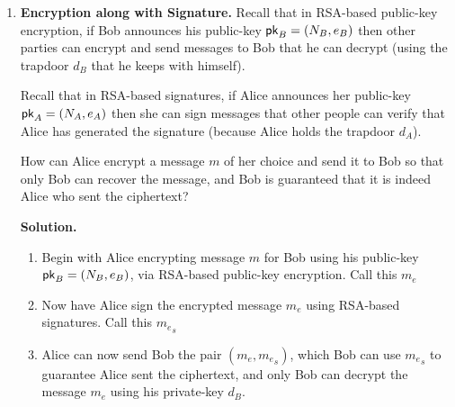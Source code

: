 \documentclass[11pt]{article}
\newcommand{\nextoddpage}{\checkoddpage\ifoddpage{\ \newpage\ \newpage}\else{\ \newpage}\fi}
\begin{document}
\begin{enumerate}
  {\bfseries Solution.} 
  \begin{enumerate}
  \item Answer a
  \item Answer b
  \end{enumerate}  
   
  
\nextoddpage 
\item {\bfseries Encryption along with Signature.}
  Recall that in RSA-based public-key encryption, if Bob announces his public-key $\mathsf{pk}_B = (N_B,e_B)$ then other parties can encrypt and send messages to Bob that he can decrypt (using the trapdoor $d_B$ that he keeps with himself). 
  
  Recall that in RSA-based signatures, if Alice announces her public-key $\mathsf{pk}_A=(N_A,e_A)$ then she can sign messages that other people can verify that Alice has generated the signature (because Alice holds the trapdoor $d_A$). 
  
  How can Alice encrypt a message $m$ of her choice and send it to Bob so that only Bob can recover the message, and Bob is guaranteed that it is indeed Alice who sent the ciphertext?
  
  {\bfseries Solution.} 
  \begin{enumerate}
  \item Begin with Alice encrypting message $m$ for Bob using his public-key $\mathsf{pk}_B = (N_B,e_B)$, via RSA-based public-key encryption. Call this $m_e$
  \item Now have Alice sign the encrypted message $m_e$ using RSA-based signatures. Call this ${m_e}_s$
  \item Alice can now send Bob the pair $(m_e, {m_e}_s)$, which Bob can use ${m_e}_s$ to guarantee Alice sent the ciphertext, and only Bob can decrypt the message $m_e$ using his private-key $d_B$.
  \end{enumerate}  
  
   
  
  
  
   

   
    

 
 



\end{enumerate}
\end{document}
